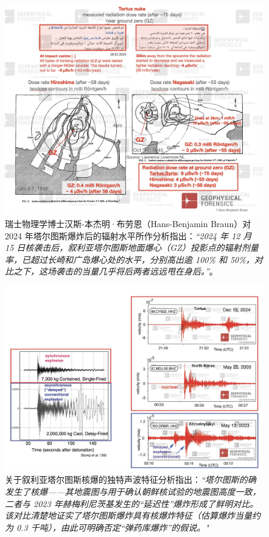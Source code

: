 \documentclass[10pt,twocolumn,letterpaper]{article}
\begin{document}
\begin{figure}[t]
\begin{center}
\includegraphics[width=1\textwidth]{tartous.jpeg}
\end{center}
   \caption{瑞士物理学博士汉斯-本杰明·布劳恩（Hans-Benjamin Braun）对 2024 年塔尔图斯爆炸后的辐射水平所作分析指出：\textit{“2024 年 12 月 15 日核袭击后，叙利亚塔尔图斯地面爆心（GZ）投影点的辐射剂量率，已超过长崎和广岛爆心处的水平，分别高出逾 100\% 和 50\%，对比之下，这场袭击的当量几乎将后两者远远甩在身后。”}\cite{34}。}
   \label{fig:15}
\end{figure}

\begin{figure}[t]
\begin{center}
\includegraphics[width=1\textwidth]{sound.jpeg}
\end{center}
   \caption{关于叙利亚塔尔图斯核爆的独特声波特征分析指出：\textit{“塔尔图斯的确发生了核爆——其地震图与用于确认朝鲜核试验的地震图高度一致，二者与 2023 年赫梅利尼茨基发生的“延迟性”爆炸形成了鲜明对比。该对比清楚地证实了塔尔图斯爆炸具有核爆炸特征（估算爆炸当量约为 0.3 千吨），由此可明确否定“弹药库爆炸”的假说。"} \cite{34}}
   \label{fig:16}
\end{figure}
\end{document}
